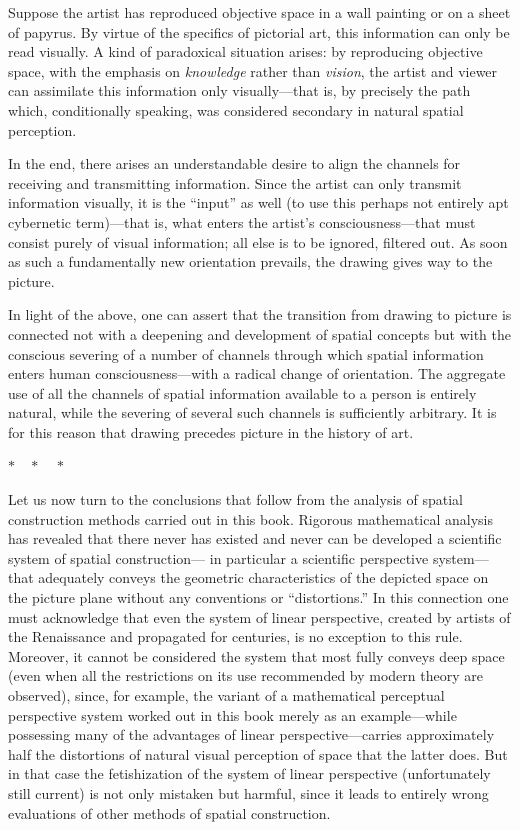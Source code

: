 Suppose the artist has reproduced objective space in a wall painting or on a sheet of
papyrus.  By virtue of the specifics of pictorial art, this information can only be read
visually.  A kind of paradoxical situation arises: by reproducing objective space, with
the emphasis on \emph{knowledge} rather than \emph{vision}, the artist and viewer can
assimilate this information only visually---that is, by precisely the path which,
conditionally speaking, was considered secondary in natural spatial perception.

In the end, there arises an understandable desire to align the channels for receiving and
transmitting information.  Since the artist can only transmit information visually, it is
the ``input'' as well (to use this perhaps not entirely apt cybernetic term)---that is,
what enters the artist's consciousness---that must consist purely of visual information;
all else is to be ignored, filtered out.  As soon as such a fundamentally new orientation
prevails, the drawing gives way to the picture.

In light of the above, one can assert that the transition from drawing to picture is
connected not with a deepening and development of spatial concepts but with the conscious
severing of a number of channels through which spatial information enters human
consciousness---with a radical change of orientation.  The aggregate use of all the
channels of spatial information available to a person is entirely natural, while the
severing of several such channels is sufficiently arbitrary.  It is for this reason that
drawing precedes picture in the history of art.

\begin{center}$*\quad*\quad*$\end{center}


Let us now turn to the conclusions that follow from the analysis of spatial construction
methods carried out in this book.  Rigorous mathematical analysis has revealed that there
never has existed and never can be developed a scientific system of spatial construction---
in particular a scientific perspective system---that adequately conveys the geometric
characteristics of the depicted space on the picture plane without any conventions or
``distortions.''  In this connection one must acknowledge that even the system of linear
perspective, created by artists of the Renaissance and propagated for centuries, is no
exception to this rule.  Moreover, it cannot be considered the system that most fully
conveys deep space (even when all the restrictions on its use recommended by modern
theory are observed), since, for example, the variant of a mathematical perceptual
perspective system worked out in this book merely as an example---while possessing many of
the advantages of linear perspective---carries approximately half the distortions of
natural visual perception of space that the latter does.  But in that case the fetishization
of the system of linear perspective (unfortunately still current) is not only mistaken but
harmful, since it leads to entirely wrong evaluations of other methods of spatial
construction.

